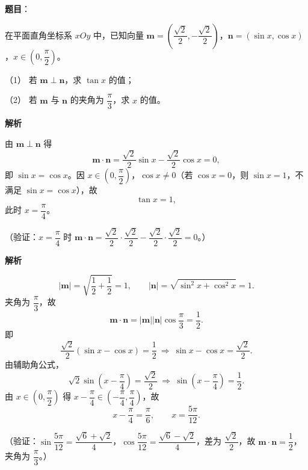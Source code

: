 \begin{answer}

\textbf{题目}：

在平面直角坐标系 \(xOy\) 中，已知向量 \(\boldsymbol{m}=\left(\dfrac{\sqrt{2}}{2},-\dfrac{\sqrt{2}}{2}\right)\)，\(\boldsymbol{n}=(\sin x,\cos x)\)，\(x\in\left(0,\dfrac{\pi}{2}\right)\)。

（1） 若 \(\boldsymbol{m}\perp\boldsymbol{n}\)，求 \(\tan x\) 的值；

（2） 若 \(\boldsymbol{m}\) 与 \(\boldsymbol{n}\) 的夹角为 \(\dfrac{\pi}{3}\)，求 \(x\) 的值。

\textbf{解析}


由 \(\boldsymbol{m}\perp\boldsymbol{n}\) 得
\nopagebreak[4]
\[
\boldsymbol{m}\cdot\boldsymbol{n}=\frac{\sqrt2}{2}\sin x-\frac{\sqrt2}{2}\cos x=0,
\]
即 \(\sin x=\cos x\)。因 \(x\in\left(0,\dfrac{\pi}{2}\right)\)，\(\cos x\ne0\)（若 \(\cos x=0\)，则 \(\sin x=1\)，不满足 \(\sin x=\cos x\)），故
\nopagebreak[4]
\[
\tan x=1,
\]
此时 \(x=\dfrac{\pi}{4}\)。

（验证：\(x=\dfrac{\pi}{4}\) 时 \(\boldsymbol{m}\cdot\boldsymbol{n}=\dfrac{\sqrt2}{2}\cdot\dfrac{\sqrt2}{2}-\dfrac{\sqrt2}{2}\cdot\dfrac{\sqrt2}{2}=0\)。）


\textbf{解析}

\nopagebreak[4]
\[
|\boldsymbol{m}|=\sqrt{\frac12+\frac12}=1,\qquad
|\boldsymbol{n}|=\sqrt{\sin^2x+\cos^2x}=1.
\]
夹角为 \(\dfrac{\pi}{3}\)，故
\nopagebreak[4]
\[
\boldsymbol{m}\cdot\boldsymbol{n}=|\boldsymbol{m}||\boldsymbol{n}|\cos\frac{\pi}{3}=\frac12.
\]
即
\nopagebreak[4]
\[
\frac{\sqrt2}{2}(\sin x-\cos x)=\frac12
\ \Longrightarrow\ \sin x-\cos x=\frac{\sqrt2}{2}.
\]
由辅助角公式，
\nopagebreak[4]
\[
\sqrt2\sin\left(x-\frac{\pi}{4}\right)=\frac{\sqrt2}{2}
\ \Longrightarrow\ \sin\left(x-\frac{\pi}{4}\right)=\frac12.
\]
由 \(x\in\left(0,\dfrac{\pi}{2}\right)\) 得 \(x-\dfrac{\pi}{4}\in\left(-\dfrac{\pi}{4},\dfrac{\pi}{4}\right)\)，故
\nopagebreak[4]
\[
x-\frac{\pi}{4}=\frac{\pi}{6},\qquad x=\frac{5\pi}{12}.
\]

（验证：\(\sin\dfrac{5\pi}{12}=\dfrac{\sqrt6+\sqrt2}{4}\)，\(\cos\dfrac{5\pi}{12}=\dfrac{\sqrt6-\sqrt2}{4}\)，差为 \(\dfrac{\sqrt2}{2}\)，故 \(\boldsymbol{m}\cdot\boldsymbol{n}=\dfrac12\)，夹角为 \(\dfrac{\pi}{3}\)。）



\end{answer}

